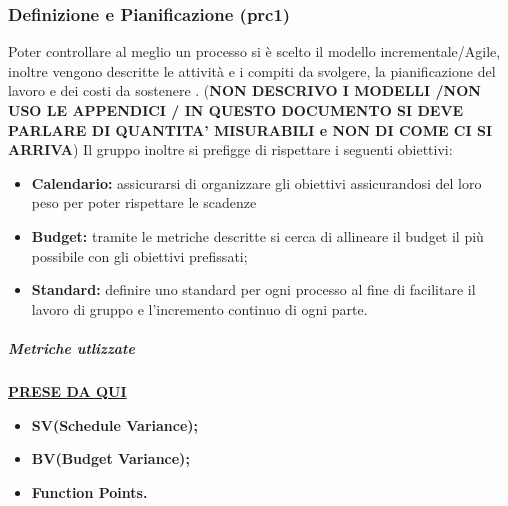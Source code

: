 \subsubsection{Definizione e Pianificazione (prc1)}
Poter controllare al meglio un processo si è scelto il modello incrementale/Agile, inoltre vengono descritte le attività e i compiti da svolgere, la pianificazione del lavoro e dei costi da sostenere . (\textbf{NON DESCRIVO I MODELLI /NON USO LE APPENDICI / IN QUESTO DOCUMENTO SI DEVE PARLARE DI QUANTITA' MISURABILI e NON DI COME CI SI ARRIVA}) Il gruppo inoltre si prefigge di rispettare i seguenti obiettivi:
\begin{itemize}
		\item{\textbf{Calendario:} assicurarsi di organizzare gli obiettivi assicurandosi del loro peso per poter rispettare le scadenze}
		\item{\textbf{Budget:} tramite le metriche descritte si cerca di allineare il budget il più possibile con gli obiettivi prefissati;}
		\item{\textbf{Standard:} definire uno standard per ogni processo al fine di facilitare il lavoro di gruppo e l'incremento continuo di ogni parte.}
\end{itemize} 
\subparagraph{Metriche utlizzate}
\href{https://it.wikipedia.org/wiki/Metriche_di_progetto}{\textbf{PRESE DA QUI}}
\begin{itemize}
	\item{\textbf{SV(Schedule Variance);}}
	\item{\textbf{BV(Budget Variance);}}
	\item{\textbf{Function Points.} }
\end{itemize}
\begin{table}[!htpb]
	\centering
	\renewcommand{\arraystretch}{2} 
	\caption{TBD}
\end{table}

